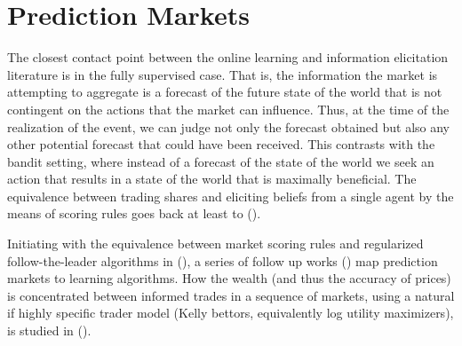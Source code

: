 


\section{Prediction Markets} 

The closest contact point between the online learning and information elicitation literature is in the fully supervised case.
That is, the information the market is attempting to aggregate is a forecast of the future state of the world that is not contingent on the actions that the market can influence. Thus, at the time of the realization of the event, we can judge not only the forecast obtained but also any other potential forecast that could have been received. 
This contrasts with the bandit setting, where instead of a forecast of the state of the world we seek an action that results in a state of the world that is maximally beneficial.
The equivalence between trading shares and eliciting beliefs from a single agent by the means of scoring rules goes back at least to (\cite{savage1971elicitation}). 





Initiating with the equivalence between market scoring rules and regularized follow-the-leader algorithms in (\cite{chen2010new}), a series of follow up works (\cite{abernethy2013efficient, frongillo2012interpreting, hu2014multi, frongillo2015convergence}) map prediction markets to learning algorithms. 
How the wealth (and thus the accuracy of prices) is concentrated between informed trades in a sequence of markets, using a natural if highly specific trader model (Kelly bettors, equivalently log utility maximizers), is studied in (\cite{beygelzimer2012learning}).


